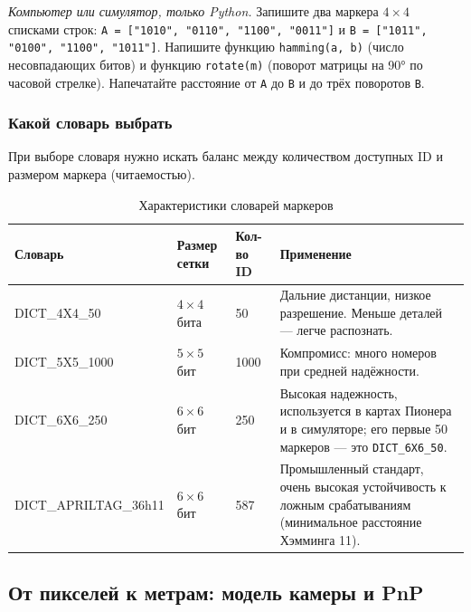 \begin{taskbox}
\emph{Компьютер или симулятор, только Python.} Запишите два маркера $4 \times 4$ списками строк: \verb|A = ["1010", "0110", "1100", "0011"]| и \verb|B = ["1011", "0100", "1100", "1011"]|. Напишите функцию \verb|hamming(a, b)| (число несовпадающих битов) и функцию \verb|rotate(m)| (поворот матрицы на 90° по часовой стрелке). Напечатайте расстояние от \verb|A| до \verb|B| и до трёх поворотов \verb|B|.
\end{taskbox}

\subsubsection*{Какой словарь выбрать}
При выборе словаря нужно искать баланс между количеством доступных ID и размером маркера (читаемостью).

\begin{table}[H]
\centering
\begin{tabularx}{\textwidth}{|l|X|X|X|}
\hline
\textbf{Словарь} & \textbf{Размер сетки} & \textbf{Кол-во ID} & \textbf{Применение} \\ \hline
DICT\_4X4\_50 & $4 \times 4$ бита & 50 & Дальние дистанции, низкое разрешение. Меньше деталей — легче распознать. \\ \hline
DICT\_5X5\_1000 & $5 \times 5$ бит & 1000 & Компромисс: много номеров при средней надёжности. \\ \hline
DICT\_6X6\_250 & $6 \times 6$ бит & 250 & Высокая надежность, используется в картах Пионера и в симуляторе; его первые 50 маркеров --- это \texttt{DICT\_6X6\_50}. \\ \hline
DICT\_APRILTAG\_36h11 & $6 \times 6$ бит & 587 & Промышленный стандарт, очень высокая устойчивость к ложным срабатываниям (минимальное расстояние Хэмминга 11). \\ \hline
\end{tabularx}
\caption{Характеристики словарей маркеров}
\end{table}

\subsection{От пикселей к метрам: модель камеры и PnP}
\label{sec:python-pnp}

